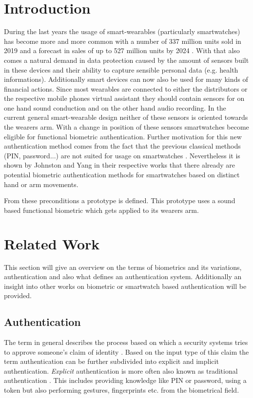 \section{Introduction}
During the last years the usage of smart-wearables (particularly smartwatches) has become more and more common with a number of 337 million units sold in 2019 and a forecast in sales of up to 527 million units by 2024 \cite{tenzer}.
With that also comes a natural demand in data protection caused by the amount of sensors built in these devices and their ability to capture sensible personal data (e.g. health informations).
Additionally smart devices can now also be used for many kinds of financial actions.
Since most wearables are connected to either the distributors or the respective mobile phones virtual assistant they should contain sensors for on one hand sound conduction and on the other hand audio recording.
In the current general smart-wearable design neither of these sensors is oriented towards the wearers arm.
With a change in position of these sensors smartwatches become eligible for functional biometric authentication.
Further motivation for this new authentication method comes from the fact that the previous classical methods (PIN, password...) are not suited for usage on smartwatches \cite{xu2017gait}.   
Nevertheless it is shown by Johnston \cite{johnston2015smartwatch} and Yang \cite{yang2015motionauth} in their respective works that there already are potential biometric authentication methods for smartwatches based on distinct hand or arm movements. 

From these preconditions a prototype is defined. This prototype uses a sound based functional biometric which gets applied to its wearers arm. 

\section{Related Work}
This section will give an overview on the terms of biometrics and its variations, authentication and also what defines an authentication system.
Additionally an insight into other works on biometric or smartwatch based authentication will be provided. 

\subsection{Authentication}
The term in general describes the process based on which a security systems tries to approve someone's claim of identity \cite{bhattacharyya2009biometric}.
Based on the input type of this claim the term authentication can be further subdivided into explicit and implicit authentication.
\textit{Explicit} authentication is more often also known as traditional authentication \cite{ranjan2016automatic}.
This includes providing knowledge like PIN or password, using a token but also performing gestures, fingerprints etc. from the biometrical field.

